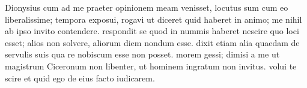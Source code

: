 


 Dionysius cum ad me praeter opinionem meam venisset, locutus sum cum eo liberalissime; tempora exposui, rogavi ut diceret quid haberet in animo; me nihil ab ipso invito contendere. respondit se quod in nummis haberet nescire quo loci esset; alios non solvere, aliorum diem nondum esse. dixit etiam alia quaedam de servulis suis qua re nobiscum esse non posset. morem gessi; dimisi a me ut magistrum Ciceronum non libenter, ut hominem ingratum non invitus. volui te scire et quid ego de eius facto iudicarem.
